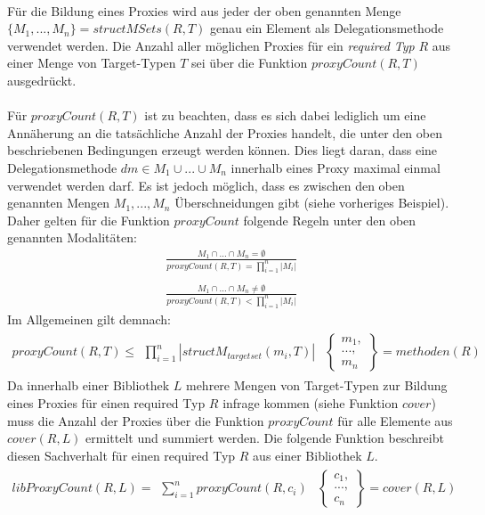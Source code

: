 \\
Für die Bildung eines Proxies wird aus jeder der oben genannten Menge $\{M_1,...,M_n\} = structMSets(R,T)$ genau ein Element als Delegationsmethode verwendet werden. Die Anzahl aller möglichen Proxies für ein \emph{required Typ} $R$ aus einer Menge von Target-Typen $T$ sei über die Funktion $\mathit{proxyCount(R,T)}$ ausgedrückt. 
\\\\
Für $\mathit{proxyCount(R,T)}$ ist zu beachten, dass es sich dabei lediglich um eine Annäherung an die tatsächliche Anzahl der Proxies handelt, die unter den oben beschriebenen Bedingungen erzeugt werden können. Dies liegt daran, dass eine Delegationsmethode $dm \in M_1 \cup ... \cup M_n$ innerhalb eines Proxy maximal einmal verwendet werden darf. Es ist jedoch möglich, dass es zwischen den oben genannten Mengen 
$M_1,...,M_n$ Überschneidungen gibt (siehe vorheriges Beispiel). Daher gelten für die Funktion $\mathit{proxyCount}$ folgende Regeln unter den oben genannten Modalitäten:
\begin{gather*}
\frac{M_1 \cap ... \cap M_n = \emptyset}{\mathit{proxyCount(R,T)} = \prod\limits_{i=1}^{n}|M_i| }
\\\\
\frac{M_1 \cap ... \cap M_n \neq \emptyset}{\mathit{proxyCount(R,T)} < \prod\limits_{i=1}^{n}|M_i| }
\end{gather*}
\noindent
Im Allgemeinen gilt demnach:
\begin{gather*}
\mathit{proxyCount(R,T)} \leq 
\begin{array}{l|l}
\prod\limits_{i=1}^{n}|\mathit{structM_{targetset}(m_i, T)}|
&
\left\{
\begin{array}{l}
m_1,\\
...,\\
m_n
\end{array}
\right\}
= \mathit{methoden(R)}
\end{array}
\end{gather*}
Da innerhalb einer Bibliothek $L$ mehrere Mengen von Target-Typen zur Bildung eines Proxies für einen required Typ $R$ infrage kommen (siehe Funktion $\mathit{cover}$) muss die Anzahl der Proxies über die Funktion $\mathit{proxyCount}$ für alle Elemente aus $\mathit{cover(R,L)}$ ermittelt und summiert werden. Die folgende Funktion beschreibt diesen Sachverhalt für einen required Typ $R$ aus einer Bibliothek $L$.
\begin{gather*}
\mathit{libProxyCount(R,L)} = 
\begin{array}{l|l}
\sum_{i=1}^{n}\mathit{proxyCount(R,c_i)}
&
\left\{
\begin{array}{l}
c_1,\\
...,\\
c_n
\end{array}
\right\} = \mathit{cover(R,L)}
\end{array}
\end{gather*}